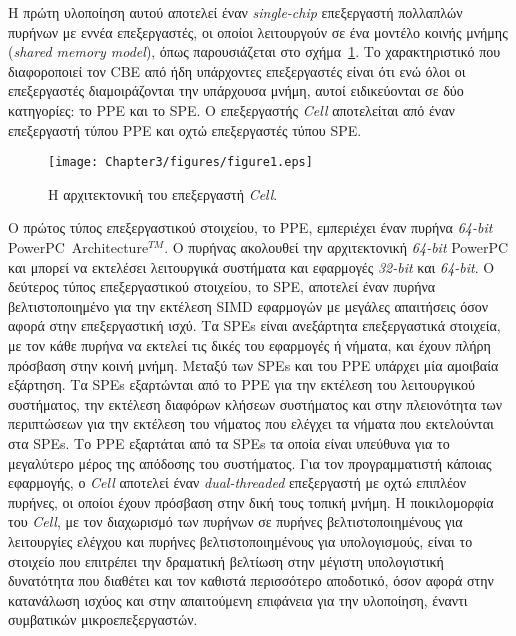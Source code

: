 Η πρώτη υλοποίηση αυτού αποτελεί έναν \textsl{single-chip} επεξεργαστή πολλαπλών πυρήνων με εννέα επεξεργαστές, οι οποίοι λειτουργούν σε ένα μοντέλο κοινής μνήμης (\textsl{shared memory model}), όπως παρουσιάζεται στο σχήμα~\ref{figure:fig31}. Το χαρακτηριστικό που διαφοροποιεί τον \ac{CBE} από ήδη υπάρχοντες επεξεργαστές είναι ότι ενώ όλοι οι επεξεργαστές διαμοιράζονται την υπάρχουσα μνήμη, αυτοί ειδικεύονται σε δύο κατηγορίες: το \acf{PPE} και το \acf{SPE}. Ο επεξεργαστής \textsl{Cell} αποτελείται από έναν επεξεργαστή τύπου \ac{PPE} και οχτώ επεξεργαστές τύπου \ac{SPE}.

\begin{figure}
\centering
\texttt{[image: Chapter3/figures/figure1.eps]}
\caption{Η αρχιτεκτονική του επεξεργαστή \textsl{Cell}.}
\label{figure:fig31}
\end{figure}
Ο πρώτος τύπος επεξεργαστικού στοιχείου, το \ac{PPE}, εμπεριέχει έναν πυρήνα \textsl{64-bit} PowerPC\circledR \ Architecture\(^{TM}\). Ο πυρήνας ακολουθεί την αρχιτεκτονική \textsl{64-bit} PowerPC και μπορεί να εκτελέσει λειτουργικά συστήματα και εφαρμογές \textsl{32-bit} και \textsl{64-bit}. Ο δεύτερος τύπος επεξεργαστικού στοιχείου, το \ac{SPE}, αποτελεί έναν πυρήνα βελτιστοποιημένο για την εκτέλεση \acf{SIMD} εφαρμογών με μεγάλες απαιτήσεις όσον αφορά στην επεξεργαστική ισχύ.\newline \indent
Τα \acp{SPE} είναι ανεξάρτητα επεξεργαστικά στοιχεία, με τον κάθε πυρήνα να εκτελεί τις δικές του εφαρμογές ή νήματα, και έχουν πλήρη πρόσβαση στην κοινή μνήμη. Μεταξύ των \acp{SPE} και του \ac{PPE} υπάρχει μία αμοιβαία εξάρτηση. Τα \acp{SPE} εξαρτώνται από το \ac{PPE} για την εκτέλεση του λειτουργικού συστήματος, την εκτέλεση διαφόρων κλήσεων συστήματος και στην πλειονότητα των περιπτώσεων για την εκτέλεση του νήματος που ελέγχει τα νήματα που εκτελούνται στα \acp{SPE}. Το \ac{PPE} εξαρτάται από τα \acp{SPE} τα οποία είναι υπεύθυνα για το μεγαλύτερο μέρος της απόδοσης του συστήματος.\newline \indent
Για τον προγραμματιστή κάποιας εφαρμογής, ο \textsl{Cell} αποτελεί έναν \textsl{dual-threaded} επεξεργαστή με οχτώ επιπλέον πυρήνες, οι οποίοι έχουν πρόσβαση στην δική τους τοπική μνήμη. Η ποικιλομορφία του \textsl{Cell}, με τον διαχωρισμό των πυρήνων σε πυρήνες βελτιστοποιημένους για λειτουργίες ελέγχου και πυρήνες βελτιστοποιημένους για υπολογισμούς, είναι το στοιχείο που επιτρέπει την δραματική βελτίωση στην μέγιστη υπολογιστική δυνατότητα που διαθέτει και τον καθιστά περισσότερο αποδοτικό, όσον αφορά στην κατανάλωση ισχύος και στην απαιτούμενη επιφάνεια για την υλοποίηση, έναντι συμβατικών μικροεπεξεργαστών.\newline \indent
